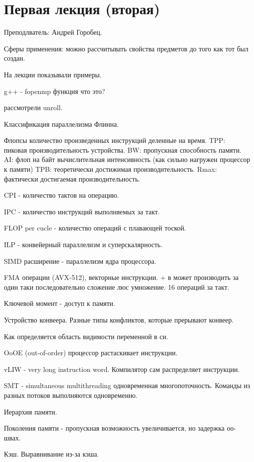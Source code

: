 \documentclass[14pt]{extarticle}
\begin{document}
\section{Первая лекция (вторая)}

Преподлватель: Андрей Горобец.

Сферы применения: можно рассчитывать свойства предметов до того как тот был создан.

На лекции показывали примеры.

g++ - fopenmp функция что это?

рассмотрели unroll.

Классификация параллелизма Флинна.

Флопсы количество произведенных инструкций деленные на время. TPP: пиковая производительность устройства. BW: пропускная способность памяти. AI: флоп на байт вычислительная интенсивность (как сильно нагружен процессор к памяти) TPB: теоретически достижимая производительность. Rmax: фактически достигаемая производительность.

CPI - количество тактов на операцию.

IPC - количество инструкций выполняемых за такт.

FLOP per cucle - количество операций с плавающей тоской.

ILP - конвейерный параллелизм и суперскалярность.

SIMD расширение - параллелизм ядра процессора.

FMA операции (AVX-512), векторные инструкции. + в может производить за один таки последовательно сложение люс умножение. 16 операций за такт.

Ключевой момент - доступ к памяти.

Устройство конвеера. Разные типы конфликтов, которые прерывают конвеер.

Как определяется область видимости переменной в си.

OoOE (out-of-order) процессор растаскивает инструкции.

vLIW - very long instruction word. Компилятор сам распределяет инструкции.

SMT - simultaneous multithreading одновременная многопоточность. Команды из разных потоков выполняются одновременно.

Иерархия памяти.

Поколения памяти - пропускная возможность увеличивается, но задержка оо- швах.

Кэш.
Выравнивание из-за кэша.
\end{document}
